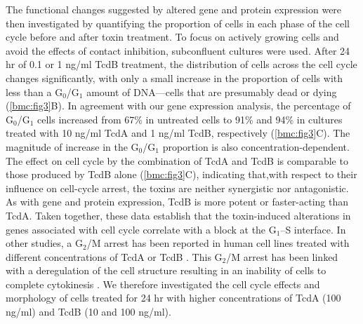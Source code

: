 The functional changes suggested by altered gene and protein expression were then investigated by quantifying the proportion of cells in each phase of the cell cycle before and after toxin treatment. To focus on actively growing cells and avoid the effects of contact inhibition, subconfluent cultures were used. After 24 hr of 0.1 or 1 ng/ml TcdB treatment, the distribution of cells across the cell cycle changes significantly, with only a small increase in the proportion of cells with less than a G$_{\text{0}}$/G$_{\text{1}}$ amount of DNA—cells that are presumably dead or dying (\autoref{bmc:fig3}B). In agreement with our gene expression analysis, the percentage of G$_{\text{0}}$/G$_{\text{1}}$ cells increased from 67\% in untreated cells to 91\% and 94\% in cultures treated with 10 ng/ml TcdA and 1 ng/ml TcdB, respectively (\autoref{bmc:fig3}C). The magnitude of increase in the G$_{\text{0}}$/G$_{\text{1}}$ proportion is also concentration-dependent. The effect on cell cycle by the combination of TcdA and TcdB is comparable to those produced by TcdB alone (\autoref{bmc:fig3}C), indicating that,with respect to their influence on cell-cycle arrest, the toxins are neither synergistic nor antagonistic. As with gene and protein expression, TcdB is more potent or faster-acting than TcdA. Taken together, these data establish that the toxin-induced alterations in genes associated with cell cycle correlate with a block at the G$_{\text{1}}$–S interface. In other studies, a G$_{\text{2}}$/M arrest has been reported in human cell lines treated with different concentrations of TcdA or TcdB \cite{Kim:2005jk, Gerhard:2008wz, Nottrott:2007ep}. This G$_{\text{2}}$/M arrest has been linked with a deregulation of the cell structure resulting in an inability of cells to complete cytokinesis \cite{Huelsenbeck:2009di}. We therefore investigated the cell cycle effects and morphology of cells treated for 24 hr with higher concentrations of TcdA (100 ng/ml) and TcdB (10 and 100 ng/ml).

